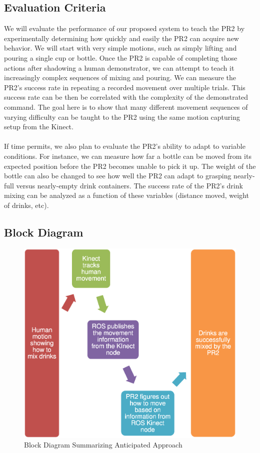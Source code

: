 \documentclass{sig-alternate}
\begin{document}
\subsection{Evaluation Criteria}
\label{subsec:eval_criteria}
We will evaluate the performance of our proposed system to teach the PR2 by experimentally determining how quickly and easily the PR2
can acquire new behavior. We will start with very simple motions, such as simply lifting and pouring a single cup or bottle. Once the PR2 is capable of completing those actions after shadowing a human demonstrator, we can attempt to teach it increasingly complex sequences of mixing and pouring. We can measure the PR2's success rate in repeating a recorded movement over multiple trials. This success rate can be then be correlated with the complexity of the demonstrated command. The goal here is to show that many different movement sequences of varying difficulty can be taught to the PR2 using the same motion capturing setup from the Kinect.\\
\\
If time permits, we also plan to evaluate the PR2's ability to adapt to variable conditions. For instance, we can measure how far a bottle can be moved from its expected position before the PR2 becomes unable to pick it up. The weight of the bottle can also be changed to see how well the PR2 can adapt to grasping nearly-full versus nearly-empty drink containers. The success rate of the PR2's drink mixing can be analyzed as a function of these variables (distance moved, weight of drinks, etc).
\subsection{Block Diagram}
\label{subsec:block_diagram}

\begin{figure}[h!] 
	\begin{center}
		\includegraphics[width=0.9\linewidth]{flowchart}
	\end{center}
	\caption{Block Diagram Summarizing Anticipated Approach}
	\label{fig:some_graph}
\end{figure}
\end{document}
